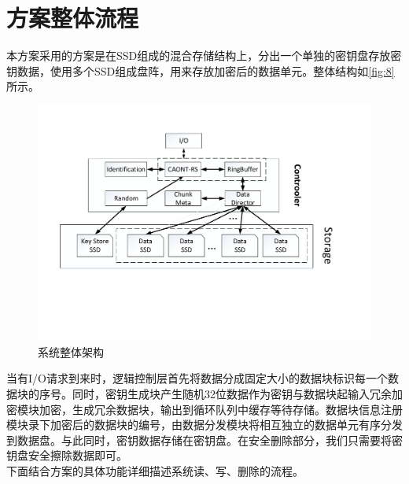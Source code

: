 \section{方案整体流程}
本方案采用的方案是在SSD组成的混合存储结构上，分出一个单独的密钥盘存放密钥数据，使用多个SSD组成盘阵，用来存放加密后的数据单元。整体结构如\autoref{fig:8}所示。
\begin{figure}[H]
	\centering
	\includegraphics[width=1\textwidth]{Pics/total-store-structure.pdf}
	\caption{系统整体架构}\label{fig:8}
\end{figure}
当有I/O请求到来时，逻辑控制层首先将数据分成固定大小的数据块标识每一个数据块的序号。同时，密钥生成块产生随机32位数据作为密钥与数据块起输入冗余加密模块加密，生成冗余数据块，输出到循环队列中缓存等待存储。数据块信息注册模块录下加密后的数据块的编号，由数据分发模块将相互独立的数据单元有序分发到数据盘。与此同时，密钥数据存储在密钥盘。在安全删除部分，我们只需要将密钥盘安全擦除数据即可。\\


下面结合方案的具体功能详细描述系统读、写、删除的流程。
